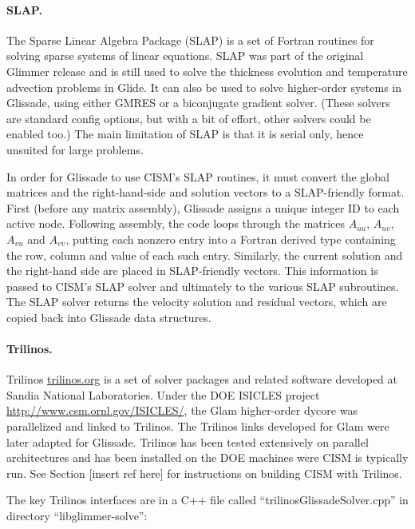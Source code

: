 \paragraph{SLAP.}

The Sparse Linear Algebra Package (SLAP) is a set of Fortran routines for solving sparse systems of linear
equations. SLAP was part of the original Glimmer release and is still used to solve the thickness evolution
and temperature advection problems in Glide.  It can also be used to solve higher-order systems in Glissade,
using either GMRES or a biconjugate gradient solver. (These solvers are standard config options, but with a bit of
effort, other solvers could be enabled too.)  The main limitation of SLAP is that it is serial only,
hence unsuited for large problems.

In order for Glissade to use CISM's SLAP routines, it must convert the global matrices and the 
right-hand-side and solution vectors to a SLAP-friendly format. First (before any matrix assembly),
Glissade assigns a unique integer ID to each active node.  Following assembly, the code loops through the matrices
$A_{uu}$, $A_{uv}$, $A_{vu}$ and $A_{vv}$, putting each nonzero entry into a Fortran derived type containing
the row, column and value of each such entry.  Similarly, the current solution and the right-hand side are placed
in SLAP-friendly vectors. This information is passed to CISM's SLAP solver
and ultimately to the various SLAP subroutines.  The SLAP solver returns the velocity solution
and residual vectors, which are copied back into Glissade data structures.

\paragraph{Trilinos.}

Trilinos \url{trilinos.org} is a set of solver packages and related software developed at 
Sandia National Laboratories. Under the DOE ISICLES project \url{http://www.csm.ornl.gov/ISICLES/},
the Glam higher-order dycore was parallelized and linked to Trilinos.  The Trilinos links
developed for Glam were later adapted for Glissade.  Trilinos has been tested extensively on
parallel architectures and has been installed on the DOE machines were CISM is typically run.
See Section [insert ref here] for instructions on building CISM with Trilinos.

The key Trilinos interfaces are in a C++ file called ``trilinosGlissadeSolver.cpp'' in directory ``libglimmer-solve'':

